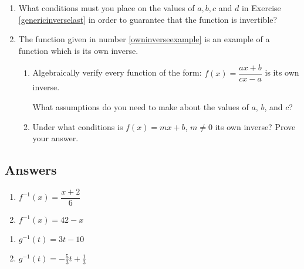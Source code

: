 \documentclass{ximera}
\begin{document}
\begin{enumerate}
\setcounter{enumi}{\value{HW}}

\item \label{whatconditions} What conditions must you place on the values of $a, b, c$ and $d$ in Exercise \ref{genericinverselast} in order to guarantee that the function is invertible?


\item  The function given in number \ref{owninverseexample} is an example of a function which is its own inverse.  

\begin{enumerate}

\item Algebraically verify every function of the form: $f(x) = \dfrac{ax + b}{cx - a}$ is its own inverse.  

What assumptions do you need to make about the values of  $a$, $b$, and $c$?

\item  Under what conditions is $f(x) = mx + b$, $m \neq 0$ its own inverse?  Prove your answer.

\end{enumerate}
\setcounter{HW}{\value{enumi}}
\end{enumerate}

\newpage

\subsection{Answers}

\begin{multicols}{2}
\begin{enumerate}
\addtocounter{enumi}{8}

\item $f^{-1}(x) = \dfrac{x + 2}{6}$
\item $f^{-1}(x) = 42-x$

\setcounter{HW}{\value{enumi}}
\end{enumerate}
\end{multicols}

\begin{multicols}{2}
\begin{enumerate}
\setcounter{enumi}{\value{HW}}

\item  $g^{-1}(t) = 3t-10$
\item $g^{-1}(t)  = -\frac{5}{3} t + \frac{1}{3}$


\setcounter{HW}{\value{enumi}}
\end{enumerate}
\end{multicols}
\end{document}
